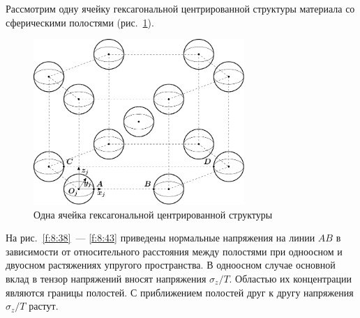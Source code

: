 Рассмотрим одну ячейку гексагональной центрированной структуры материала со сферическими полостями (рис.~\ref{f:8:37}).

\begin{figure}[h!]
\centering
\includegraphics[width=8cm]{spheres-cav-13.pdf}
\caption{Одна ячейка гексагональной центрированной структуры}
\label{f:8:37}
\end{figure}

На рис.~\ref{f:8:38}~--- \ref{f:8:43} приведены нормальные напряжения на линии $AB$ в зависимости от относительного расстояния между полостями при одноосном и двуосном растяжениях упругого пространства. В одноосном случае основной вклад в тензор напряжений вносят напряжения $\sigma_z/T$. Областью их концентрации являются границы полостей. С приближением полостей друг к другу напряжения $\sigma_z/T$ растут.

